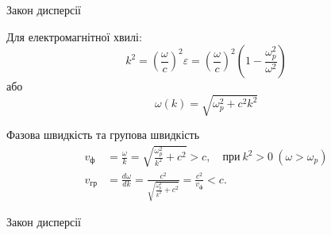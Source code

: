\documentclass[]{beamer}
\begin{document}
\begin{frame}{Закон дисперсії}{}
	\begin{block}{}
		Для електромагнітної хвилі:
		\begin{equation*}
			k^2 = \left( \frac{\omega}{c}\right)^2\varepsilon =  \left( \frac{\omega}{c}\right)^2\left( 1 - \frac{\omega_p^2}{\omega^2} \right)
		\end{equation*}
		або
		\begin{equation*}
			\omega(k) = \sqrt{\omega_p^2 + c^2k^2}
		\end{equation*}
	\end{block}
	\begin{block}{Фазова швидкість та групова швидкість}
		\begin{align*}
			v_\text{ф}  & = \frac{\omega}{k} = \sqrt{\frac{\omega_p^2}{k^2} + c^2} > c, \quad \text{при}\ k^2 > 0\ (\omega > \omega_p) \\
			v_\text{гр} & = \frac{d\omega}{dk} = \frac{c^2}{\sqrt{\frac{\omega_p^2}{k^2} + c^2}} = \frac{c^2}{v_\text{ф}} < c.
		\end{align*}
	\end{block}
\end{frame}

\begin{frame}{Закон дисперсії}{}
	\begin{center}
		
	\end{center}
\end{frame}
\end{document}

